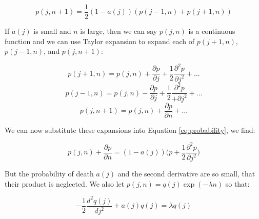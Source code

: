 \documentclass[journal]{IEEEtran}
\begin{document}
\begin{equation}
  \label{eq:probability}
  p(j, n+1) =  \frac{1}{2}(1-a(j))(p(j-1,n) + p(j+1,n))
\end{equation}

If $a(j)$ is small and $n$ is large, then we can say $p(j, n)$ is a continuous
function and we can use Taylor expansion to expand each of $p(j+1, n)$,
$p(j-1,n)$, and $p(j, n+1)$:

\begin{equation}
  p(j+1, n) = p(j,n) + \frac{\partial p}{\partial j} + \frac{1}{2}
  \frac{\partial^2 p}{\partial j^2} + ...
  \nonumber
\end{equation}
\begin{equation}
  p(j-1, n) = p(j,n) - \frac{\partial p}{\partial j} + \frac{1}{2}
  \frac{\partial^2 p}{+\partial j^2} + ...
  \nonumber
\end{equation}
\begin{equation}
  p(j, n+1) = p(j, n) + \frac{\partial p}{\partial n} + ...
  \nonumber
\end{equation}

We can now substitute these expansions into Equation \ref{eq:probability}, we
find:

\begin{equation}
  p(j, n) + \frac{\partial p}{\partial n} = (1-a(j))\Big(p +
  \frac{1}{2}\frac{\partial^2 p}{\partial j^2}\Big)
  \nonumber
\end{equation}

But the probability of death $a(j)$ and the second derivative are so small, that
their product is neglected. We also let $p(j,n) = q(j) \exp(-\lambda n)$ so that:

\begin{equation}
  -\frac{1}{2} \frac{d^2q(j)}{dj^2} + a(j)q(j) = \lambda q(j)
  \nonumber
\end{equation}

\printbibliography
\end{document}
